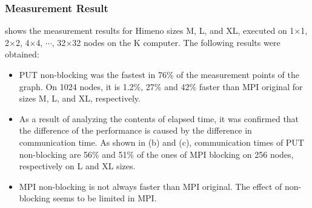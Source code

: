 \subsubsection{Measurement Result}

 shows the measurement results for Himeno sizes M, L, and XL,
executed on 1$\times$1, 2$\times$2, 4$\times$4, $\cdots$, 32$\times$32 nodes on the
K computer. The following results were obtained:
\begin{itemize}
\item
PUT non-blocking was the fastest in 76\% of the measurement points of the graph. 
On 1024 nodes, it is 1.2\%, 27\% and 42\% faster than MPI original for sizes M, L, 
and XL, respectively.

\item
As a result of analyzing the contents of elapsed time, it was confirmed that the
difference of the performance is caused by the difference in communication
time. As shown in (b) and (c), communication times of PUT non-blocking are
56\% and 51\% of the ones of MPI blocking on 256 nodes, respectively on L and 
XL sizes.

\item
MPI non-blocking is not always faster than MPI original. The effect of 
non-blocking seems to be limited in MPI.

\end{itemize}

